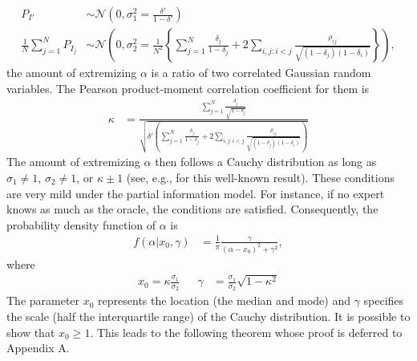 \documentclass[11pt]{article}
\theoremstyle{definition}
\theoremstyle{definition}
\begin{document}
\begin{align*}
P_{I'} &\sim \mathcal{N}\left(0, \sigma^2_{1} = \frac{\delta'}{1-\delta'} \right)\\
\frac{1}{N}\sum_{j=1}^N P_{I_j} &\sim \mathcal{N}\left(0, \sigma^2_{2} =\frac{1}{N^2} \left\{ \sum_{j=1}^N \frac{\delta_j}{1-\delta_j} + 2 \sum_{i,j: i<j} \frac{\rho_{ij}}{\sqrt{(1-\delta_j)(1-\delta_i)}}\right\} \right),
\end{align*}
the amount of extremizing $\alpha$ is a ratio of two correlated Gaussian random variables. The Pearson product-moment correlation coefficient for them is
\begin{align*}
\kappa  &= \frac{ \sum_{j=1}^N \frac{\delta_j}{\sqrt{1-\delta_j}}}{\sqrt{\delta'  \left( \sum_{j=1}^N \frac{\delta_j}{1-\delta_j} + 2 \sum_{i,j: i<j} \frac{\rho_{ij}}{\sqrt{(1-\delta_j)(1-\delta_i)}}\right)}}
\end{align*}
The amount of extremizing $\alpha$ then follows a Cauchy distribution as long as $\sigma_1 \neq 1$, $\sigma_2 \neq 1$, or $\kappa \pm 1$ (see, e.g., \cite{cedilnik2004distribution} for this well-known result). These conditions are very mild under the partial information model. For instance, if no expert knows as much as the oracle, the conditions are satisfied. Consequently, the probability density function of $\alpha$ is
\begin{align}
f(\alpha | x_0, \gamma) &= \frac{1}{\pi} \frac{\gamma}{(\alpha-x_0)^2+\gamma^2}, \label{Cauchy}
\end{align}
where 
\begin{align*}
x_0 = \kappa \frac{\sigma_1}{\sigma_2} && \gamma &= \frac{\sigma_1}{\sigma_2} \sqrt{1-\kappa^2}
\end{align*}
The parameter $x_0$ represents the location (the median and mode) and $\gamma$ specifies the scale (half the interquartile range) of the Cauchy distribution. It is possible to show that $x_0 \geq 1$. This leads to the following theorem whose proof is deferred to Appendix A.
\end{document}
